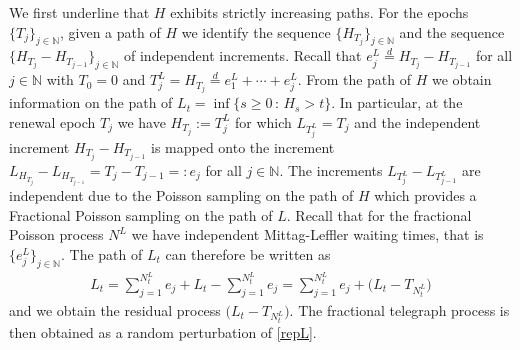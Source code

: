 \documentclass[10pt,a4paper]{article}
\numberwithin{equation}{section}
\theoremstyle{plain}
\theoremstyle{remark}
\begin{document}
We first underline that $H$ exhibits strictly increasing paths. For the epochs $\{T_j\}_{j \in \mathbb{N}}$, given a path of $H$ we identify the sequence $\{H_{T_j}\}_{j \in \mathbb{N}}$ and the sequence $\{H_{T_j} - H_{T_{j-1}}\}_{j \in \mathbb{N}}$ of independent increments. Recall that $e^L_j \stackrel{d}{=} H_{T_j} - H_{T_{j-1}}$ for all $j \in \mathbb{N}$ with $T_{0}=0$ and $T^L_j = H_{T_j} \stackrel{d}{=} e^L_1 + \cdots + e^L_j$. From the path of $H$ we obtain information on the path of $L_t = \inf\{s \geq 0\,:\, H_s >t\}$. In particular, at the renewal epoch $T_j$ we have $H_{T_j}:=T^L_j$ for which $L_{T^L_j}= T_j$ and the independent increment $H_{T_j} - H_{T_{j-1}}$ is mapped onto the increment $L_{H_{T_j}} - L_{H_{T_{j-1}}} = T_j - T_{j-1}=: e_j$ for all $j \in \mathbb{N}$. The increments $L_{T^L_j} - L_{T^L_{j-1}}$ are independent due to the Poisson sampling on the path of $H$ which provides a Fractional Poisson sampling on the path of $L$. Recall that for the fractional Poisson process $N^L$ we have independent Mittag-Leffler waiting times, that is $\{e^L_j\}_{j \in \mathbb{N}}$. The path of $L_t$ can therefore be written as
\begin{align}
L_t = \sum_{j=1}^{N^L_t} e_j + L_t - \sum_{j=1}^{N^L_t} e_j = \sum_{j=1}^{N^L_t} e_j + \big(L_t - T_{N^L_t} \big)
\label{repL}
\end{align}
and we obtain the residual process $\big(L_t - T_{N^L_t}\big)$. The fractional telegraph process is then obtained as a random perturbation of \eqref{repL}. 
\end{document}
